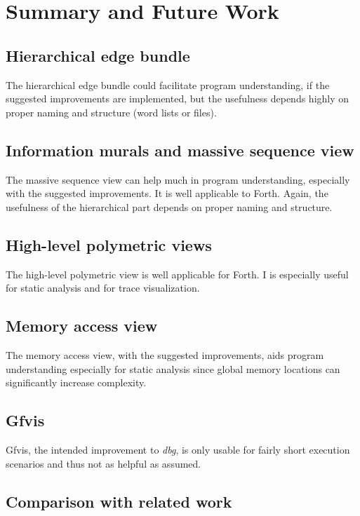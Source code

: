 \chapter{Summary and Future Work}
\label{chap:Summary}

\section*{Hierarchical edge bundle}
The hierarchical edge bundle could facilitate program understanding, if the suggested improvements are implemented, but the usefulness depends highly on proper naming and structure (word lists or files).

\section*{Information murals and massive sequence view}
The massive sequence view can help much in program understanding, especially with the suggested improvements. It is well applicable to Forth. Again, the usefulness of the hierarchical part depends on proper naming and structure.

\section*{High-level polymetric views}

The high-level polymetric view is well applicable for Forth. I is especially useful for static analysis and for trace visualization.

\section*{Memory access view}

The memory access view, with the suggested improvements, aids program understanding especially for static analysis since global memory locations can significantly increase complexity.

\section*{Gfvis}

Gfvis, the intended improvement to \emph{dbg}, is only usable for fairly short execution scenarios and thus not as helpful as assumed.

\section{Comparison with related work}

